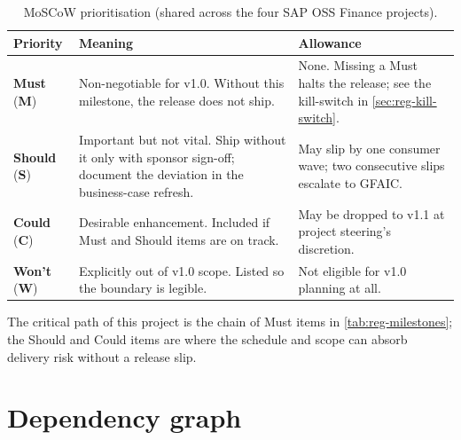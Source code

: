 \begin{table}[htbp]
\centering
\caption{MoSCoW prioritisation (shared across the four SAP OSS Finance
projects).}
\label{tab:reg-moscow}
\footnotesize
\begin{tabularx}{\linewidth}{@{}l l X@{}}
\toprule
\textbf{Priority} & \textbf{Meaning} & \textbf{Allowance} \\ \midrule
\textbf{Must} (\textbf{M}) & Non-negotiable for v1.0. Without this milestone, the release does not ship. & None. Missing a Must halts the release; see the kill-switch in \cref{sec:reg-kill-switch}. \\
\textbf{Should} (\textbf{S}) & Important but not vital. Ship without it only with sponsor sign-off; document the deviation in the business-case refresh. & May slip by one consumer wave; two consecutive slips escalate to GFAIC. \\
\textbf{Could} (\textbf{C}) & Desirable enhancement. Included if Must and Should items are on track. & May be dropped to v1.1 at project steering's discretion. \\
\textbf{Won't} (\textbf{W}) & Explicitly out of v1.0 scope. Listed so the boundary is legible. & Not eligible for v1.0 planning at all. \\
\bottomrule
\end{tabularx}
\end{table}

\noindent
The critical path of this project is the chain of Must items in
\cref{tab:reg-milestones}; the Should and Could items are where the
schedule and scope can absorb delivery risk without a release slip.

\section{Dependency graph}\label{sec:reg-dependency-graph}

